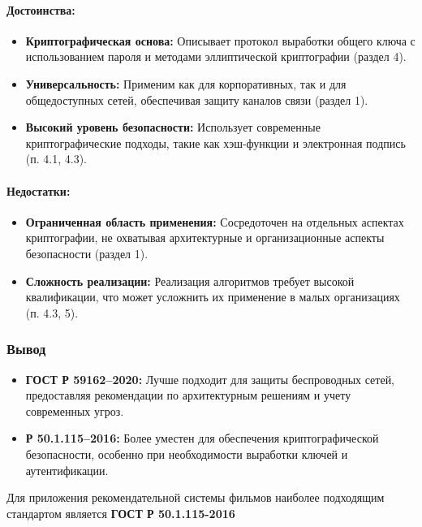 \paragraph{Достоинства:}
\begin{itemize}
\item \textbf{Криптографическая основа:} Описывает протокол выработки общего ключа с использованием пароля и методами эллиптической криптографии (раздел 4).
\item \textbf{Универсальность:} Применим как для корпоративных, так и для общедоступных сетей, обеспечивая защиту каналов связи (раздел 1).
\item \textbf{Высокий уровень безопасности:} Использует современные криптографические подходы, такие как хэш-функции и электронная подпись (п. 4.1, 4.3).
\end{itemize}

\paragraph{Недостатки:}
\begin{itemize}
\item \textbf{Ограниченная область применения:} Сосредоточен на отдельных аспектах криптографии, не охватывая архитектурные и организационные аспекты безопасности (раздел 1).
\item \textbf{Сложность реализации:} Реализация алгоритмов требует высокой квалификации, что может усложнить их применение в малых организациях (п. 4.3, 5).
\end{itemize}

\subsubsection*{Вывод}
\begin{itemize}
\item \textbf{ГОСТ Р 59162–2020:} Лучше подходит для защиты беспроводных сетей, предоставляя рекомендации по архитектурным решениям и учету современных угроз.
\item \textbf{Р 50.1.115–2016:} Более уместен для обеспечения криптографической безопасности, особенно при необходимости выработки ключей и аутентификации.
\end{itemize}

Для приложения рекомендательной системы фильмов наиболее подходящим стандартом является \textbf{ГОСТ Р 50.1.115-2016}
